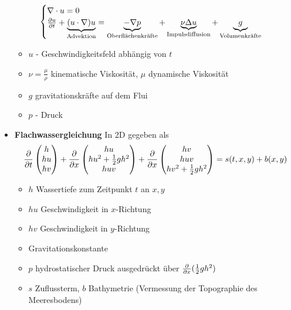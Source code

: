 \begin{definition}
\begin{itemize}[noitemsep]
\begin{align*}
			\begin{cases}
				\nabla \cdot u = 0 \\
				\frac{\partial u}{\partial t} + \underbrace{(u \cdot \nabla)u}_{\text{Advektion}} =\underbrace{ - \nabla p}_{\text{Oberflächenkräfte}} + \underbrace{\nu \Delta u}_{\text{Impulsdiffusion}} + \underbrace{g}_{\text{Volumenkräfte}}
			\end{cases}
		\end{align*} 
		\begin{itemize}[noitemsep]
			\item  $u$ - Geschwindigkeitsfeld abhängig von $t$
			\item  $\nu = \frac{\mu}{\rho}$ kinematische Viskosität, $\mu$ dynamische Viskosität 			
			\item  $g$ gravitationskräfte auf dem Flui
			\item  $p$ - Druck	
		\end{itemize}
		\item \textbf{Flachwassergleichung} In 2D gegeben als
		\begin{align*}
			\frac{\partial }{\partial t}\begin{pmatrix}
				h \\
				h u \\
				h v 
			\end{pmatrix} +
			\frac{\partial }{\partial x} \begin{pmatrix}
				h u \\
				h u^2 + \frac{1}{2} gh^2 \\
				huv
			\end{pmatrix} +
			\frac{\partial }{\partial x} \begin{pmatrix}
				hv \\
				huv \\
				h v^2 + \frac{1}{2} gh^2
			\end{pmatrix} = s(t,x,y) + b(x,y)
		\end{align*} 
	\begin{itemize}[noitemsep]
		\item $h$ Wassertiefe zum Zeitpunkt $t$ an $x,y$
		\item  $h u$ Geschwindigkeit in $x$-Richtung
		\item  $h v$ Geschwindigkeit in $y$-Richtung	
		\item  Gravitationskonstante
		\item  $p$ hydrostatischer Druck ausgedrückt über $\frac{\partial }{\partial x}(\frac{1}{2}gh^2)$
		\item  $s$ Zuflussterm, $b$ Bathymetrie (Vermessung der Topographie des Meeresbodens)
	\end{itemize}
	\end{itemize}
\end{definition}

